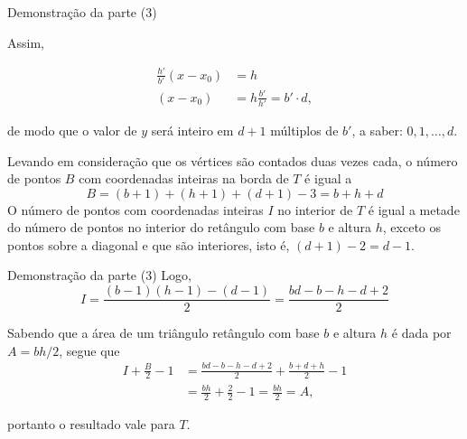 \begin{frame}[fragile]{Demonstração da parte (3)}

    Assim,

    \begin{align*}
        \frac{h'}{b'}(x - x_0) &= h\\
        (x - x_0) &= h\frac{b'}{h'} = b'\cdot d,
    \end{align*}

    de modo que o valor de $y$ será inteiro em $d + 1$ múltiplos de $b'$, a saber: $0, 1, \ldots, d$.
        \pause

    Levando em consideração que os vértices são contados duas vezes cada, o número de pontos $B$
    com coordenadas inteiras na borda de $T$ é igual a
    \[
        B = (b + 1) + (h + 1) + (d + 1) - 3 = b + h + d
    \] \pause
    O número de pontos com coordenadas inteiras $I$ no interior de $T$ é igual a metade do
    número de pontos no interior do retângulo com base $b$ e altura $h$, exceto os pontos sobre
    a diagonal e que são interiores, isto é, $(d + 1) - 2 = d - 1$.
\end{frame}

\begin{frame}[fragile]{Demonstração da parte (3)}
    Logo,
    \[
        I = \frac{(b - 1)(h - 1) - (d - 1)}{2} = \frac{bd - b - h - d + 2}{2}
    \]
        \pause

    Sabendo que a área de um triângulo retângulo com base $b$ e altura $h$ é dada por
    $A = bh/2$, segue que
    \begin{align*}
        I + \frac{B}{2} - 1 &= \frac{bd - b - h - d + 2}{2} + \frac{b + d + h}{2} - 1 \\
        &= \frac{bh}{2} + \frac{2}{2} - 1 = \frac{bh}{2} = A,
    \end{align*}

    portanto o resultado vale para $T$.
\end{frame}

